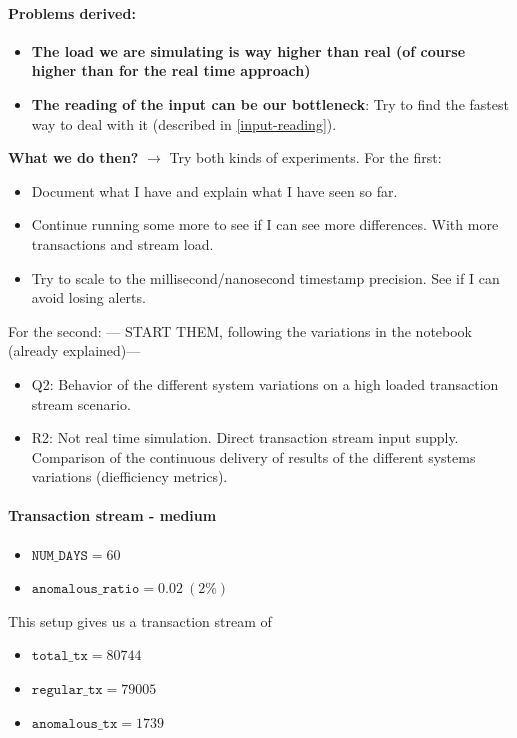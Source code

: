\documentclass[12pt,a4paper]{article}
\begin{document}
\paragraph{Problems derived:\\}
\begin{itemize}
    \item \textbf{The load we are simulating is way higher than real (of course higher than for the real time approach)}
    \item \textbf{The reading of the input can be our bottleneck}: Try to find the fastest way to deal with it (described in \ref{input-reading}).    
\end{itemize}

\textbf{What we do then?}
$\rightarrow$ Try both kinds of experiments. 
For the first:
\begin{itemize}
    \item Document what I have and explain what I have seen so far.
    \item Continue running some more to see if I can see more differences. With more transactions and stream load.
    \item Try to scale to the millisecond/nanosecond timestamp precision. See if I can avoid losing alerts.
\end{itemize}
For the second:
--- START THEM, following the variations in the notebook (already explained)---

\begin{itemize}
  \item Q2: Behavior of the different system variations on a high loaded transaction stream scenario.
  \item R2: Not real time simulation. Direct transaction stream input supply. Comparison of the continuous delivery of results of the different systems variations (diefficiency metrics).
\end{itemize}

\paragraph{Transaction stream - medium\\}

\begin{itemize}
  \item $\texttt{NUM\_DAYS} = 60$
  \item $\texttt{anomalous\_ratio} = 0.02\ (2\%)$ 
\end{itemize}

This setup gives us a transaction stream of 
\begin{itemize}
  \item $\texttt{total\_tx} = 80744$
  \item $\texttt{regular\_tx} = 79005$
  \item $\texttt{anomalous\_tx} = 1739$
\end{itemize}
\end{document}
